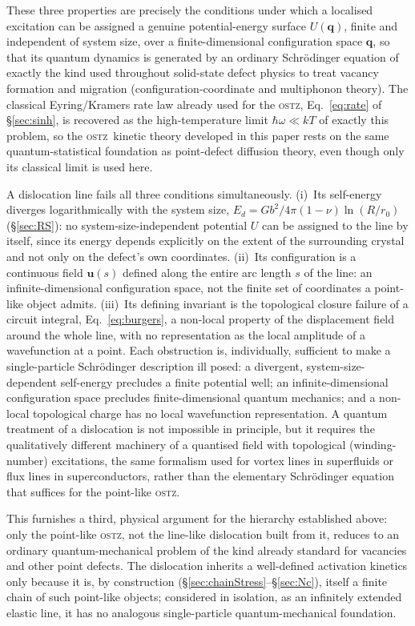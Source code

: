 \documentclass[5p,sort&compress]{elsarticle}
\newcommand{\OSTZ}{\textsc{ostz}}
\begin{document}
These three properties are precisely the conditions under which a
localised excitation can be assigned a genuine potential-energy
surface $U(\mathbf q)$, finite and independent of system size,
over a finite-dimensional configuration space $\mathbf q$, so
that its quantum dynamics is generated by an ordinary Schr\"odinger
equation of exactly the kind used throughout solid-state defect
physics to treat vacancy formation and migration
(configuration-coordinate and multiphonon theory). The classical
Eyring/Kramers rate law already used for the \OSTZ,
Eq.~\eqref{eq:rate} of \S\ref{sec:sinh}, is recovered as the
high-temperature limit $\hbar\omega\ll kT$ of exactly this problem,
so the \OSTZ\ kinetic theory developed in this paper rests on the
same quantum-statistical foundation as point-defect diffusion
theory, even though only its classical limit is used here.

A dislocation line fails all three conditions simultaneously.
(i)~Its self-energy diverges logarithmically with the system size,
$E_d=Gb^2/4\pi(1-\nu)\ln(R/r_0)$ (\S\ref{sec:RS}): no
system-size-independent potential $U$ can be assigned to the line by
itself, since its energy depends explicitly on the extent of the
surrounding crystal and not only on the defect's own coordinates.
(ii)~Its configuration is a continuous field $\mathbf u(s)$ defined
along the entire arc length $s$ of the line: an
infinite-dimensional configuration space, not the finite set of
coordinates a point-like object admits. (iii)~Its defining
invariant is the topological closure failure of a circuit integral,
Eq.~\eqref{eq:burgers}, a non-local property of the displacement
field around the whole line, with no representation as the local
amplitude of a wavefunction at a point. Each obstruction is,
individually, sufficient to make a single-particle Schr\"odinger
description ill posed: a divergent, system-size-dependent
self-energy precludes a finite potential well; an
infinite-dimensional configuration space precludes finite-dimensional
quantum mechanics; and a non-local topological charge has no local
wavefunction representation. A quantum treatment of a dislocation is
not impossible in principle, but it requires the qualitatively
different machinery of a quantised field with topological
(winding-number) excitations, the same formalism used for vortex
lines in superfluids or flux lines in superconductors, rather
than the elementary Schr\"odinger equation that suffices for the
point-like \OSTZ.

This furnishes a third, physical argument for the hierarchy
established above: only the point-like \OSTZ, not the line-like
dislocation built from it, reduces to an ordinary
quantum-mechanical problem of the kind already standard for vacancies
and other point defects. The dislocation inherits a well-defined
activation kinetics only because it is, by construction
(\S\ref{sec:chainStress}--\S\ref{sec:Nc}), itself a finite chain of
such point-like objects; considered in isolation, as an
infinitely extended elastic line, it has no analogous
single-particle quantum-mechanical foundation.
\end{document}
